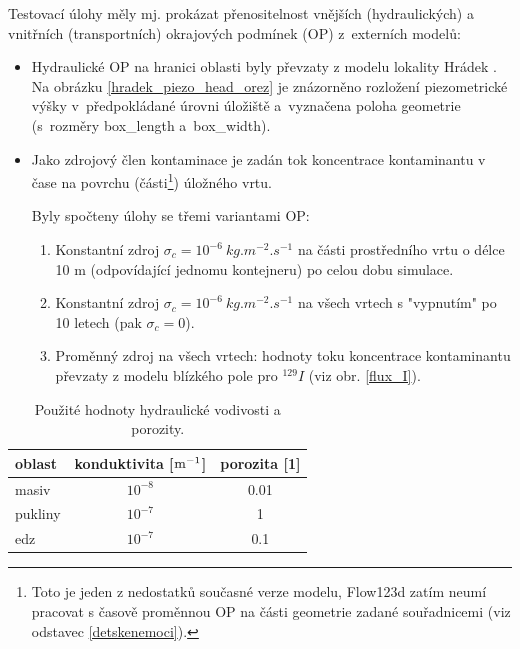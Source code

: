 \documentclass[11pt,a4paper]{article}
\newcommand{\obraz}[1]{(viz obr. \ref{#1})}
\begin{document}
\begin{onehalfspacing}
Testovací úlohy měly mj. prokázat přenositelnost vnějších (hydraulických) a vnitřních (transportních) okrajových podmínek (OP) z~externích modelů:
\begin{itemize}
\item Hydraulické OP na hranici oblasti byly převzaty z modelu lokality Hrádek \cite{riha_hradek}. Na obrázku \ref{hradek_piezo_head_orez} je znázorněno rozložení piezometrické výšky v~předpokládané úrovni úložiště a~vyznačena poloha geometrie (s~rozměry box\_length a~box\_width).
\item Jako zdrojový člen kontaminace je zadán tok koncentrace kontaminantu v čase na povrchu (části\footnote{Toto je jeden z nedostatků současné verze modelu, Flow123d zatím neumí pracovat s časově proměnnou OP na části geometrie zadané souřadnicemi (viz odstavec \ref{detskenemoci}).}) úložného vrtu. 

Byly spočteny úlohy se třemi variantami OP:
    \begin{enumerate}
        \item Konstantní zdroj $\sigma_c=10^{-6}~kg.m^{-2}.s^{-1}$ na části prostředního vrtu o délce 10 m (odpovídající jednomu kontejneru) po celou dobu simulace.
        \item Konstantní zdroj $\sigma_c=10^{-6}~kg.m^{-2}.s^{-1}$ na všech vrtech s "vypnutím" po 10 letech (pak $\sigma_c=0$).
        \item Proměnný zdroj na všech vrtech: hodnoty toku koncentrace kontaminantu převzaty z modelu blízkého pole pro $^{129}I$ \obraz{flux_I}.
    \end{enumerate}
\end{itemize}

\begin{table}[ht]
\begin{center}
    \caption{Použité hodnoty hydraulické vodivosti a porozity.}
    \begin{tabular}{ | l | c | c |}
    \hline
    \small oblast & \small konduktivita [$\rm m^{-1}$] & \small porozita [1]\\ \hline
    \small masiv & \small $10^{-8}$ & \small 0.01\\ \hline
    \small pukliny & \small $10^{-7}$ & \small 1\\ \hline
    \small edz & \small $10^{-7}$ & \small 0.1\\ \hline
    \end{tabular}
    \label{konduktivita}
\end{center}
\end{table}
\vspace{-0.3cm}


\end{onehalfspacing}
\end{document}
